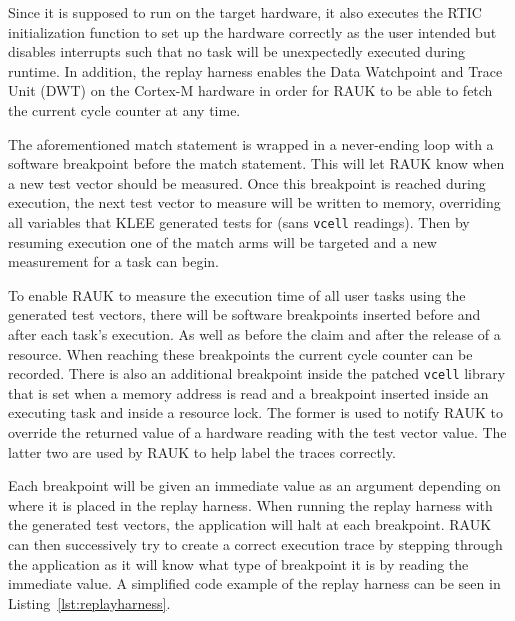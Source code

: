 Since it is supposed to run on the target hardware, it also executes the RTIC
initialization function to set up the hardware correctly as the user intended
but disables interrupts such that no task will be unexpectedly executed during
runtime. In addition, the replay harness enables the Data Watchpoint and Trace
Unit (DWT) on the Cortex-M hardware in order for RAUK to be able to fetch the
current cycle counter at any time.

The aforementioned match statement is wrapped in a never-ending loop with a
software breakpoint before the match statement. This will let RAUK know when a
new test vector should be measured. Once this breakpoint is reached during
execution, the next test vector to measure will be written to memory,
overriding all variables that KLEE generated tests for (sans \texttt{vcell}
readings). Then by resuming execution one of the match arms will be targeted
and a new measurement for a task can begin.

To enable RAUK to measure the execution time of all user tasks using the
generated test vectors, there will be software breakpoints inserted before and
after each task's execution. As well as before the claim and after the release
of a resource. When reaching these breakpoints the current cycle counter can be
recorded. There is also an additional breakpoint inside the patched
\texttt{vcell} library that is set when a memory address is read and a breakpoint
inserted inside an executing task and inside a resource lock. The former is
used to notify RAUK to override the returned value of a hardware reading with
the test vector value. The latter two are used by RAUK to help label the
traces correctly.



Each breakpoint will be given an immediate value as an argument depending on
where it is placed in the replay harness. When running the replay harness with
the generated test vectors, the application will halt at each breakpoint. RAUK
can then successively try to create a correct execution trace by stepping
through the application as it will know what type of breakpoint it is by reading
the immediate value. A simplified code example of the replay harness can be
seen in Listing~\ref{lst:replayharness}.

